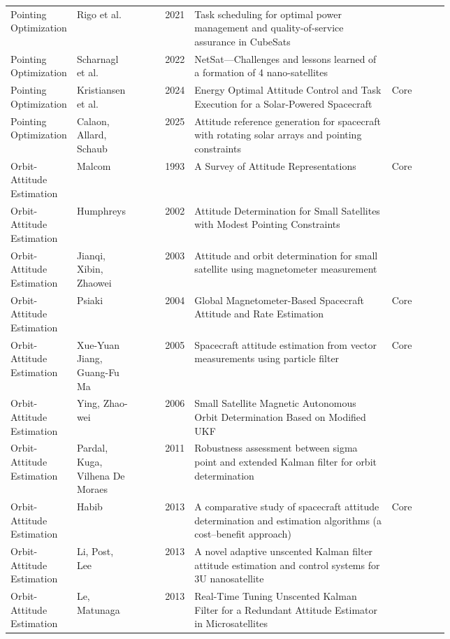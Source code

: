 \begin{longtable}{@{}p{0.14\linewidth}p{0.14\linewidth}rp{0.45\linewidth}l@{}}
    Pointing Optimization & Rigo et al. & 2021 & Task scheduling for optimal power management and quality-of-service assurance in CubeSats &  \\
    Pointing Optimization & Scharnagl et al. & 2022 & NetSat—Challenges and lessons learned of a formation of 4 nano-satellites &  \\
    Pointing Optimization & Kristiansen et al. & 2024 & Energy Optimal Attitude Control and Task Execution for a Solar-Powered Spacecraft & Core \\
    Pointing Optimization & Calaon, Allard, Schaub & 2025 & Attitude reference generation for spacecraft with rotating solar arrays and pointing constraints &  \\
    Orbit-Attitude Estimation & Malcom & 1993 & A Survey of Attitude Representations & Core \\
    Orbit-Attitude Estimation & Humphreys & 2002 & Attitude Determination for Small Satellites with Modest Pointing Constraints &  \\
    Orbit-Attitude Estimation & Jianqi, Xibin, Zhaowei & 2003 & Attitude and orbit determination for small satellite using magnetometer measurement &  \\
    Orbit-Attitude Estimation & Psiaki & 2004 & Global Magnetometer-Based Spacecraft Attitude and Rate Estimation & Core \\
    Orbit-Attitude Estimation & Xue-Yuan Jiang, Guang-Fu Ma & 2005 & Spacecraft attitude estimation from vector measurements using particle filter & Core \\
    Orbit-Attitude Estimation & Ying, Zhao-wei & 2006 & Small Satellite Magnetic Autonomous Orbit Determination Based on Modified UKF &  \\
    Orbit-Attitude Estimation & Pardal, Kuga, Vilhena De Moraes & 2011 & Robustness assessment between sigma point and extended Kalman filter for orbit determination &  \\
    Orbit-Attitude Estimation & Habib & 2013 & A comparative study of spacecraft attitude determination and estimation algorithms (a cost–benefit approach) & Core \\
    Orbit-Attitude Estimation & Li, Post, Lee & 2013 & A novel adaptive unscented Kalman filter attitude estimation and control systems for 3U nanosatellite &  \\
    Orbit-Attitude Estimation & Le, Matunaga & 2013 & Real-Time Tuning Unscented Kalman Filter for a Redundant Attitude Estimator in Microsatellites &  \\

\end{longtable}
